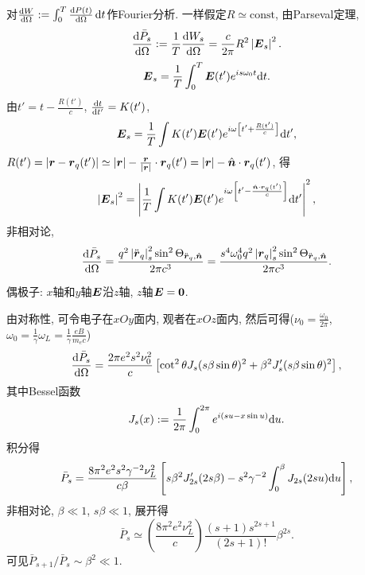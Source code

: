 对$\frac{\mathrm{d} W}{\mathrm{d} \Omega}:=\int_0^T\frac{\mathrm{d} P(t)}{\mathrm{d} \Omega}\,\mathrm{d} t$作Fourier分析. 一样假定$R\simeq\text{const}$, 由Parseval定理,
\begin{equation}
    \frac{\mathrm{d}\bar{P}_s}{\mathrm{d}\Omega}:=\frac{1}{T}\frac{\mathrm{d} W_s}{\mathrm{d}\Omega}=\frac{c}{2\pi}R^2
    \left\lvert\boldsymbol{E}_s\right\rvert^2.
\end{equation}
\begin{equation}
    \boldsymbol{E}_s=\frac{1}{T}\int_0^T \boldsymbol{E}(t')e^{is\omega_0 t}\mathrm{d} t.
\end{equation}
由$t'=t-\frac{R(t')}{c}$, $\frac{\mathrm{d} t}{\mathrm{d} t'}=K(t')$,
\begin{equation}
    \boldsymbol{E}_s=\frac{1}{T}\int K(t')\boldsymbol{E}(t')e^{i\omega \left[t'+\frac{R(t')}{c}\right]}\mathrm{d} t',
\end{equation}
$R(t')=\left\lvert\boldsymbol{r}-\boldsymbol{r}_q(t')\right\rvert\simeq\left\lvert\boldsymbol{r}\right\rvert-\frac{\boldsymbol{r}}{\left\lvert\boldsymbol{r}\right\rvert}\cdot\boldsymbol{r}_q(t')=\left\lvert\boldsymbol{r}\right\rvert-\hat{\boldsymbol{n}}\cdot\boldsymbol{r}_q(t')$, 得
\begin{equation}
    \left\lvert\boldsymbol{E}_s\right\rvert^2=\left\lvert\frac{1}{T}\int K(t')\boldsymbol{E}(t')e^{i\omega \left[t'-\frac{\hat{\boldsymbol{n}}\cdot\boldsymbol{r}_q(t')}{c}\right]}\mathrm{d} t'\right\rvert^2,
\end{equation}
非相对论,
\begin{equation}
    \frac{\mathrm{d}\bar{P}_s}{\mathrm{d}\Omega}
    =\frac{q^2\left\lvert{\ddot{\boldsymbol{r}}}_q\right\rvert_s^2\sin^2
    \Theta_{\ddot{\boldsymbol{r}}_q,\hat{\boldsymbol{n}}}}{2\pi c^3}
    =\frac{s^4\omega_0^4q^2\left\lvert{\boldsymbol{r}}_q\right\rvert_s^2\sin^2
    \Theta_{\ddot{\boldsymbol{r}}_q,\hat{\boldsymbol{n}}}}{2\pi c^3}.
\end{equation}

偶极子: $x$轴和$y$轴$\boldsymbol{E}$沿$z$轴, $z$轴$\boldsymbol{E}=\boldsymbol{0}$.

由对称性, 可令电子在$xOy$面内, 观者在$xOz$面内, 然后可得($\nu_0=\frac{\omega_0}{2\pi}$, $\omega_0=\frac{1}{\gamma}\omega_L=\frac{1}{\gamma}\frac{eB}{m_ec}$)
\begin{equation}
    \frac{\mathrm{d}\bar{P}_s}{\mathrm{d}\Omega}
    =\frac{2\pi e^2s^2\nu_0^2}{c}
    \left[\cot^2\theta J_s(s\beta\sin\theta)^2+\beta^2J_s'(s\beta\sin\theta)^2\right],
\end{equation}
其中Bessel函数
\begin{equation}
    J_s(x):=\frac{1}{2\pi}\int_0^{2\pi}e^{i(su-x\sin u)}\mathrm{d} u.
\end{equation}
积分得
\begin{equation}
    \bar{P}_s
    =\frac{8\pi^2e^2s^2\gamma^{-2}\nu_L^2}{c\beta}
    \left[s\beta^2J_{2s}'(2s\beta)-s^2\gamma^{-2}\int_0^\beta J_{2s}(2su)\mathrm{d} u\right],
\end{equation}
非相对论, $\beta\ll1$, $s\beta\ll1$, 展开得
\begin{equation}
    \bar{P}_s\simeq\left(\frac{8\pi^2e^2\nu_L^2}{c}\right)
    \frac{(s+1)s^{2s+1}}{(2s+1)!}\beta^{2s}.
\end{equation}
可见$\bar{P}_{s+1}/\bar{P}_s\sim\beta^2\ll1$.

